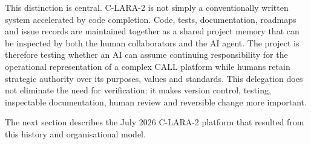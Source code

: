 This distinction is central. C-LARA-2 is not simply a conventionally written
system accelerated by code completion. Code, tests, documentation, roadmaps
and issue records are maintained together as a shared project memory that can
be inspected by both the human collaborators and the AI agent. The project is
therefore testing whether an AI can assume continuing responsibility for the
operational representation of a complex CALL platform while humans retain
strategic authority over its purposes, values and standards. This delegation
does not eliminate the need for verification; it makes version control,
testing, inspectable documentation, human review and reversible change more
important.

The next section describes the July 2026 C-LARA-2 platform that resulted from
this history and organisational model.
